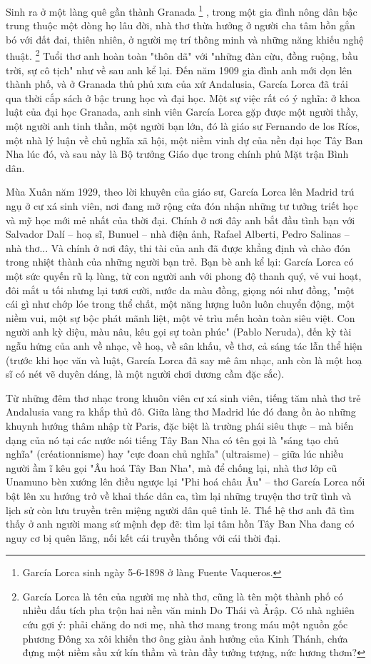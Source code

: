 \documentclass[../main.tex]{subfiles}
\begin{document}
\begin{multicols}{2}
Sinh ra ở một làng quê gần thành Granada \footnote{
García Lorca sinh ngày 5-6-1898 ở làng Fuente Vaqueros.} , trong một gia đình nông dân bậc trung thuộc một dòng họ lâu đời, nhà thơ thừa hưởng ở người cha tâm hồn gắn bó với đất đai, thiên nhiên, ở người mẹ trí thông minh và những năng khiếu nghệ thuật. \footnote{
García Lorca là tên của người mẹ nhà thơ, cũng là tên một thành phố có nhiều dấu tích pha trộn hai nền văn minh Do Thái và Ảrập. Có nhà nghiên cứu gợi ý: phải chăng do nơi mẹ, nhà thơ mang trong máu một nguồn gốc phương Đông xa xôi khiến thơ ông giàu ảnh hưởng của Kinh Thánh, chứa đựng một niềm sầu xứ kín thầm và tràn đầy tưởng tượng, nức hương thơm?}  Tuổi thơ anh hoàn toàn "thôn dã" với "những đàn cừu, đồng ruộng, bầu trời, sự cô tịch" như về sau anh kể lại. Đến năm 1909 gia đình anh mới dọn lên thành phố, và ở Granada thủ phủ xưa của xứ Andalusia, García Lorca đã trải qua thời cắp sách ở bậc trung học và đại học. Một sự việc rất có ý nghĩa: ở khoa luật của đại học Granada, anh sinh viên García Lorca gặp được một người thầy, một người anh tinh thần, một người bạn lớn, đó là giáo sư Fernando de los Ríos, một nhà lý luận về chủ nghĩa xã hội, một niềm vinh dự của nền đại học Tây Ban Nha lúc đó, và sau này là Bộ trưởng Giáo dục trong chính phủ Mặt trận Bình dân. 
 
Mùa Xuân năm 1929, theo lời khuyên của giáo sư, García Lorca lên Madrid trú ngụ ở cư xá sinh viên, nơi đang mở rộng cửa đón nhận những tư tưởng triết học và mỹ học mới mẻ nhất của thời đại. Chính ở nơi đây anh bắt đầu tình bạn với Salvador Dalí – hoạ sĩ, Bunuel – nhà điện ảnh, Rafael Alberti, Pedro Salinas – nhà thơ... Và chính ở nơi đây, thi tài của anh đã được khẳng định và chào đón trong nhiệt thành của những người bạn trẻ. Bạn bè anh kể lại: García Lorca có một sức quyến rũ lạ lùng, từ con người anh với phong độ thanh quý, vẻ vui hoạt, đôi mắt u tối nhưng lại tươi cười, nước da màu đồng, giọng nói như đồng, "một cái gì như chớp lóe trong thể chất, một năng lượng luôn luôn chuyển động, một niềm vui, một sự bộc phát mãnh liệt, một vẻ trìu mến hoàn toàn siêu việt. Con người anh kỳ diệu, màu nâu, kêu gọi sự toàn phúc" (Pablo Neruda), đến kỳ tài ngẫu hứng của anh về nhạc, về hoạ, về sân khấu, về thơ, cả sáng tác lẫn thể hiện (trước khi học văn và luật, García Lorca đã say mê âm nhạc, anh còn là một hoạ sĩ có nét vẽ duyên dáng, là một người chơi dương cầm đặc sắc). 
 
Từ những đêm thơ nhạc trong khuôn viên cư xá sinh viên, tiếng tăm nhà thơ trẻ Andalusia vang ra khắp thủ đô. Giữa làng thơ Madrid lúc đó đang ồn ào những khuynh hướng thâm nhập từ Paris, đặc biệt là trường phái siêu thực – mà biến dạng của nó tại các nước nói tiếng Tây Ban Nha có tên gọi là "sáng tạo chủ nghĩa" (créationnisme) hay "cực đoan chủ nghĩa" (ultraisme) – giữa lúc nhiều người ầm ĩ kêu gọi "Âu hoá Tây Ban Nha", mà để chống lại, nhà thơ lớp cũ Unamuno bèn xướng lên điều ngược lại "Phi hoá châu Âu" – thơ García Lorca nổi bật lên xu hướng trở về khai thác dân ca, tìm lại những truyện thơ trữ tình và lịch sử còn lưu truyền trên miệng người dân quê tỉnh lẻ. Thế hệ thơ anh đã tìm thấy ở anh người mang sứ mệnh đẹp đẽ: tìm lại tâm hồn Tây Ban Nha đang có nguy cơ bị quên lãng, nối kết cái truyền thống với cái thời đại. 
 

\end{multicols}
\end{document}
